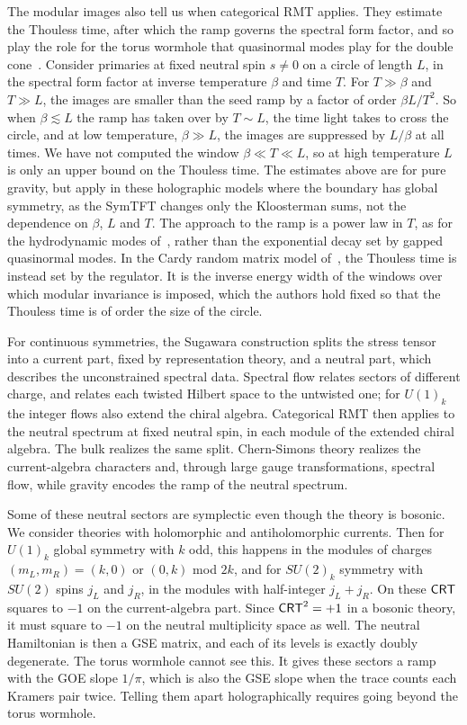 \documentclass[11pt]{article}
\numberwithin{equation}{section}
\begin{document}
The modular images also tell us when categorical RMT applies. They estimate the Thouless time, after which the ramp governs the spectral form factor, and so play the role for the torus wormhole that quasinormal modes play for the double cone~\cite{Chen:2023hra}. Consider primaries at fixed neutral spin $s\neq0$ on a circle of length $L$, in the spectral form factor at inverse temperature $\beta$ and time $T$. For $T\gg\beta$ and $T\gg L$, the images are smaller than the seed ramp by a factor of order $\beta L/T^2$. So when $\beta\lesssim L$ the ramp has taken over by $T\sim L$, the time light takes to cross the circle, and at low temperature, $\beta\gg L$, the images are suppressed by $L/\beta$ at all times. We have not computed the window $\beta\ll T\ll L$, so at high temperature $L$ is only an upper bound on the Thouless time. The estimates above are for pure gravity, but apply in these holographic models where the boundary has global symmetry, as the SymTFT changes only the Kloosterman sums, not the dependence on $\beta$, $L$ and $T$. The approach to the ramp is a power law in $T$, as for the hydrodynamic modes of~\cite{Chen:2023hra}, rather than the exponential decay set by gapped quasinormal modes. In the Cardy random matrix model of~\cite{Ambrosini:2026int}, the Thouless time is instead set by the regulator. It is the inverse energy width of the windows over which modular invariance is imposed, which the authors hold fixed so that the Thouless time is of order the size of the circle.

For continuous symmetries, the Sugawara construction splits the stress tensor into a current part, fixed by representation theory, and a neutral part, which describes the unconstrained spectral data. Spectral flow relates sectors of different charge, and relates each twisted Hilbert space to the untwisted one; for $U(1)_k$ the integer flows also extend the chiral algebra. Categorical RMT then applies to the neutral spectrum at fixed neutral spin, in each module of the extended chiral algebra. The bulk realizes the same split. Chern-Simons theory realizes the current-algebra characters and, through large gauge transformations, spectral flow, while gravity encodes the ramp of the neutral spectrum.

Some of these neutral sectors are symplectic even though the theory is bosonic. We consider theories with holomorphic and antiholomorphic currents. Then for $U(1)_k$ global symmetry with $k$ odd, this happens in the modules of charges $(m_L,m_R)=(k,0)$ or $(0,k)$ mod $2k$, and for  $SU(2)_k$ symmetry with $SU(2)$ spins $j_L$ and $j_R$, in the modules with half-integer $j_L+j_R$. On these $\mathsf{CRT}$ squares to $-1$ on the current-algebra part. Since $\mathsf{CRT}^2=+1$ in a bosonic theory, it must square to $-1$ on the neutral multiplicity space as well. The neutral Hamiltonian is then a GSE matrix, and each of its levels is exactly doubly degenerate. The torus wormhole cannot see this. It gives these sectors a ramp with the GOE slope $1/\pi$, which is also the GSE slope when the trace counts each Kramers pair twice. Telling them apart holographically requires going beyond the torus wormhole.
\end{document}

